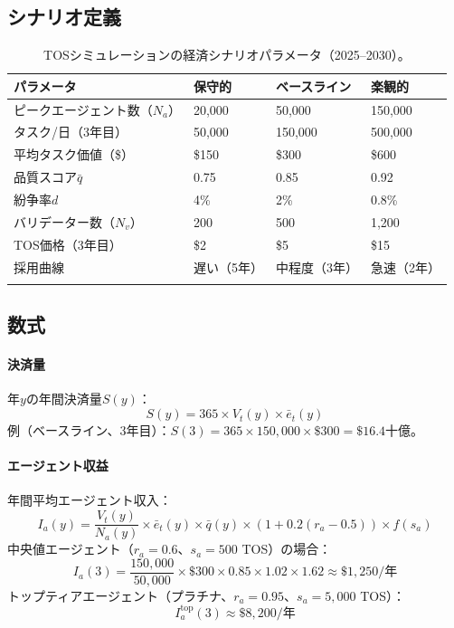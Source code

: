 \documentclass[11pt]{article}
\begin{document}
\begin{CJK}{UTF8}{min}
\subsection{シナリオ定義}
\begin{longtable}{@{}p{}p{}p{}p{}@{}}
\toprule
\textbf{パラメータ} & \textbf{保守的} & \textbf{ベースライン} & \textbf{楽観的} \\\midrule
ピークエージェント数（$N_a$） & 20,000 & 50,000 & 150,000 \\
タスク/日（3年目） & 50,000 & 150,000 & 500,000 \\
平均タスク価値（\$） & \$150 & \$300 & \$600 \\
品質スコア$\bar{q}$ & 0.75 & 0.85 & 0.92 \\
紛争率$d$ & 4\% & 2\% & 0.8\% \\
バリデーター数（$N_v$） & 200 & 500 & 1,200 \\
TOS価格（3年目） & \$2 & \$5 & \$15 \\
採用曲線 & 遅い（5年） & 中程度（3年） & 急速（2年） \\\bottomrule
\caption{TOSシミュレーションの経済シナリオパラメータ（2025--2030）。}
\label{tab:econ-scenarios}
\end{longtable}

\subsection{数式}
\paragraph{決済量} 年$y$の年間決済量$S(y)$：
\begin{equation}
S(y) = 365 \times V_t(y) \times \bar{e}_t(y)
\end{equation}
例（ベースライン、3年目）：$S(3) = 365 \times 150{,}000 \times \$300 = \$16.4$十億。

\paragraph{エージェント収益} 年間平均エージェント収入：
\begin{equation}
I_a(y) = \frac{V_t(y)}{N_a(y)} \times \bar{e}_t(y) \times \bar{q}(y) \times (1 + 0.2(r_a - 0.5)) \times f(s_a)
\end{equation}
中央値エージェント（$r_a = 0.6$、$s_a = 500$ TOS）の場合：
\begin{equation}
I_a(3) = \frac{150{,}000}{50{,}000} \times \$300 \times 0.85 \times 1.02 \times 1.62 \approx \$1{,}250 \text{/年}
\end{equation}
トップティアエージェント（プラチナ、$r_a = 0.95$、$s_a = 5{,}000$ TOS）：
\begin{equation}
I_a^{\text{top}}(3) \approx \$8{,}200 \text{/年}
\end{equation}


\end{CJK}
\end{document}
